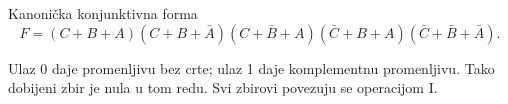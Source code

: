 \begin{frame}[label=02-s017]{Kanonička konjunktivna forma}
\[F=(C+B+A)(C+B+\bar A)(C+\bar B+A)(\bar C+B+A)(\bar C+\bar B+\bar A).\]
\par\vspace{3mm}
\par{}
\par\vspace{4mm}
Ulaz 0 daje promenljivu bez crte; ulaz 1 daje komplementnu promenljivu. Tako dobijeni zbir je nula u tom redu. Svi zbirovi povezuju se operacijom I.
\end{frame}
